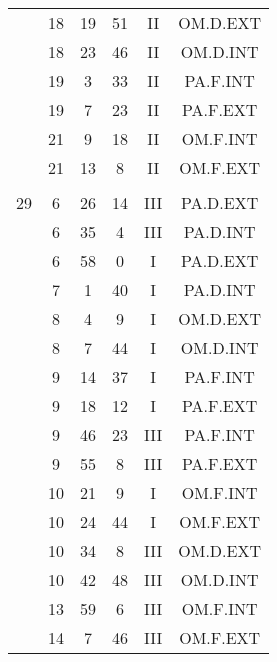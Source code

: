 \documentclass[12pt, a4paper]{article}
\begin{document}
\begin{multicols}{3}
{\begin{tabular}{c c c c c c}
	 	 	 	 & 18 & 19 & 51 & II & OM.D.EXT\\%
	 	 	 	 & 18 & 23 & 46 & II & OM.D.INT\\%
	 	 	 	 & 19 & 3 & 33 & II & PA.F.INT\\%
	 	 	 	 & 19 & 7 & 23 & II & PA.F.EXT\\%
	 	 	 	 & 21 & 9 & 18 & II & OM.F.INT\\%
	 	 	 	 & 21 & 13 & 8 & II & OM.F.EXT\\%
	 	 	 	 & & & & & \\%
	 	 	 	29 & 6 & 26 & 14 & III & PA.D.EXT\\%
	 	 	 	 & 6 & 35 & 4 & III & PA.D.INT\\%
	 	 	 	 & 6 & 58 & 0 & I & PA.D.EXT\\%
	 	 	 	 & 7 & 1 & 40 & I & PA.D.INT\\%
	 	 	 	 & 8 & 4 & 9 & I & OM.D.EXT\\%
	 	 	 	 & 8 & 7 & 44 & I & OM.D.INT\\%
	 	 	 	 & 9 & 14 & 37 & I & PA.F.INT\\%
	 	 	 	 & 9 & 18 & 12 & I & PA.F.EXT\\%
	 	 	 	 & 9 & 46 & 23 & III & PA.F.INT\\%
	 	 	 	 & 9 & 55 & 8 & III & PA.F.EXT\\%
	 	 	 	 & 10 & 21 & 9 & I & OM.F.INT\\%
	 	 	 	 & 10 & 24 & 44 & I & OM.F.EXT\\%
	 	 	 	 & 10 & 34 & 8 & III & OM.D.EXT\\%
	 	 	 	 & 10 & 42 & 48 & III & OM.D.INT\\%
	 	 	 	 & 13 & 59 & 6 & III & OM.F.INT\\%
	 	 	 	 & 14 & 7 & 46 & III & OM.F.EXT\\%

\end{tabular}}
\end{multicols}
\end{document}
